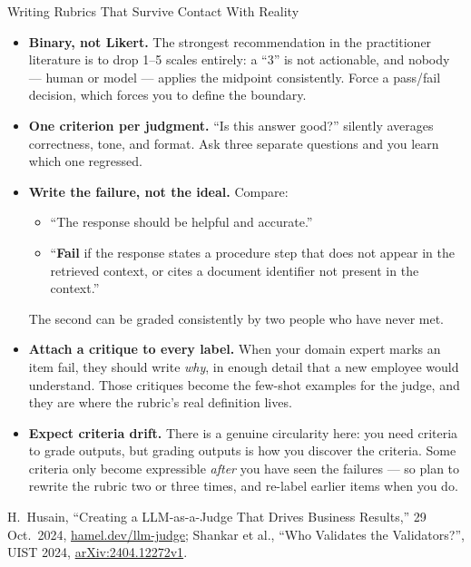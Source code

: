 \begin{frame}[allowframebreaks]{Writing Rubrics That Survive Contact With Reality}
  \begin{itemize}\footnotesize\itemsep0.3em
    \item[\textcolor{red}{$\blacktriangleright$}] \textbf{Binary, not Likert.} The strongest recommendation in the practitioner literature is to drop 1--5 scales entirely: a ``3'' is not actionable, and nobody --- human or model --- applies the midpoint consistently. Force a pass/fail decision, which forces you to define the boundary.
    \item[\textcolor{red}{$\blacktriangleright$}] \textbf{One criterion per judgment.} ``Is this answer good?'' silently averages correctness, tone, and format. Ask three separate questions and you learn which one regressed.
    \item[\textcolor{red}{$\blacktriangleright$}] \textbf{Write the failure, not the ideal.} Compare:
      \begin{itemize}\itemsep0.12em
        \item[\textcolor{red}{\xmark}] ``The response should be helpful and accurate.''
        \item[\textcolor{KAUSTcyan}{\cmark}] ``\textbf{Fail} if the response states a procedure step that does not appear in the retrieved context, or cites a document identifier not present in the context.''
      \end{itemize}
      The second can be graded consistently by two people who have never met.
    \item[\textcolor{red}{$\blacktriangleright$}] \textbf{Attach a critique to every label.} When your domain expert marks an item fail, they should write \textit{why}, in enough detail that a new employee would understand. Those critiques become the few-shot examples for the judge, and they are where the rubric's real definition lives.
    \item[\textcolor{red}{$\blacktriangleright$}] \textbf{Expect criteria drift.} There is a genuine circularity here: you need criteria to grade outputs, but grading outputs is how you discover the criteria. Some criteria only become expressible \textit{after} you have seen the failures --- so plan to rewrite the rubric two or three times, and re-label earlier items when you do.
  \end{itemize}
  \vspace{0.1em}
  {\scriptsize H.~Husain, ``Creating a LLM-as-a-Judge That Drives Business Results,'' 29 Oct.\ 2024, \href{https://hamel.dev/blog/posts/llm-judge/}{hamel.dev/llm-judge}; Shankar et al., ``Who Validates the Validators?'', UIST 2024, \href{https://arxiv.org/abs/2404.12272v1}{arXiv:2404.12272v1}.}
\end{frame}

